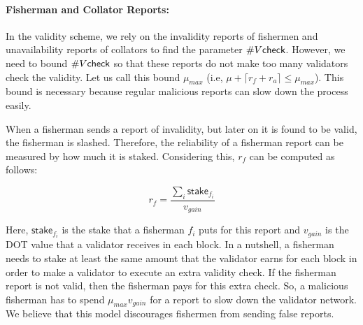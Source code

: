 \paragraph{Fisherman and Collator Reports:} In the validity scheme, we rely on the invalidity reports of fishermen and unavailability reports of collators to find the parameter $ \#V\mathsf{check} $. However, we need to bound $\#V\mathsf{check}$ so that these reports do not make too many validators check the validity. Let us call this bound $\mu_{max}$ (i.e, $\mu + \lceil r_f + r_a \rceil \leq \mu_{max}$). This bound is necessary because regular malicious reports can slow down the process easily. 

When a fisherman sends a report of invalidity, but later on it is found to be valid, the fisherman is slashed. Therefore, the reliability of a fisherman report can be measured by how much it is staked. 
Considering this, $r_f$ can be computed as follows:

$$r_f = \frac{\sum_{i}\mathsf{stake}_{f_i}}{v_{gain}}$$

Here, $\mathsf{stake}_{f_i}$ is the stake that a fisherman $f_i$ puts for this report and $v_{gain}$ is the DOT value that a validator receives in each block. In a nutshell, a fisherman needs to stake at least the same amount that the validator earns for each block in order to make a validator to execute an extra validity check. If the fisherman report is not valid, then the fisherman pays for this extra check. So, a malicious fisherman has to spend $\mu_{max} v_{gain}$ for a report to slow down the validator network. We believe that this model discourages fishermen from sending false reports. 

